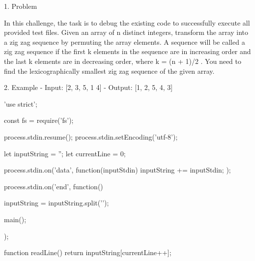 1. Problem

In this challenge, the task is to debug the existing code to successfully execute all provided test files.
Given an array of n distinct integers, transform the array into a zig zag sequence by permuting the array elements. 
A sequence will be called a zig zag sequence if the first k elements in the sequence are in increasing order and the
last k elements are in decreasing order, where k = (n +  1)/2 . You need to find the lexicographically smallest zig zag sequence of the given array.

2. Example
- Input: [2, 3, 5, 1 4]
- Output: [1, 2, 5, 4, 3]


'use strict';

const fs = require('fs');

process.stdin.resume();
process.stdin.setEncoding('utf-8');

let inputString = '';
let currentLine = 0;

process.stdin.on('data', function(inputStdin) {
    inputString += inputStdin;
});

process.stdin.on('end', function() {
    inputString = inputString.split('\n');

    main();
});

function readLine() {
    return inputString[currentLine++];
}


